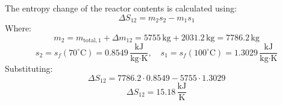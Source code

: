 The entropy change of the reactor contents is calculated using:  
\[
\Delta S_{12} = m_2 s_2 - m_1 s_1
\]  
Where:  
\[
m_2 = m_{\text{total},1} + \Delta m_{12} = 5755 \, \text{kg} + 2031.2 \, \text{kg} = 7786.2 \, \text{kg}
\]  
\[
s_2 = s_f(70^\circ\text{C}) = 0.8549 \, \frac{\text{kJ}}{\text{kg·K}}, \quad s_1 = s_f(100^\circ\text{C}) = 1.3029 \, \frac{\text{kJ}}{\text{kg·K}}
\]  
Substituting:  
\[
\Delta S_{12} = 7786.2 \cdot 0.8549 - 5755 \cdot 1.3029
\]  
\[
\Delta S_{12} = 15.18 \, \frac{\text{kJ}}{\text{K}}
\]